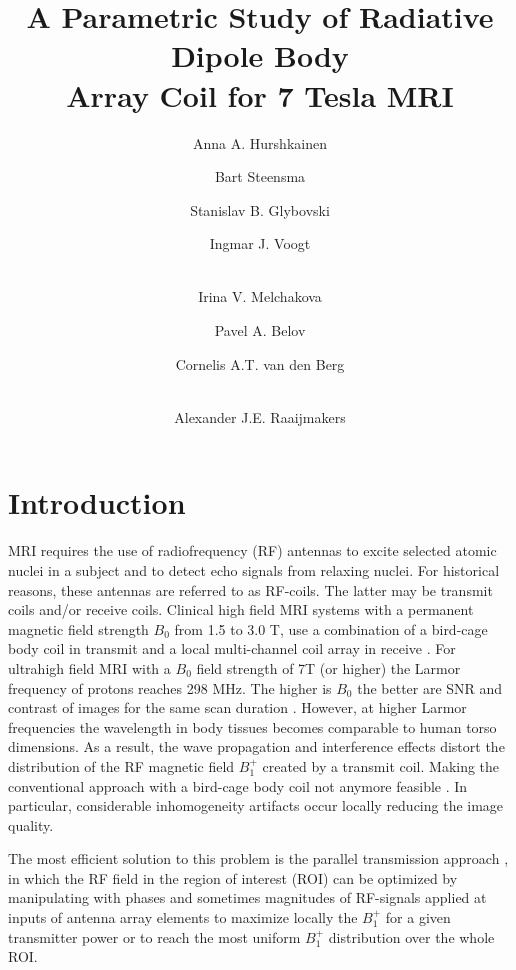 \documentclass[fleqn,10pt]{wlscirep}
\title{A Parametric Study of Radiative Dipole Body\\ Array Coil for 7 Tesla MRI}
\author[1,*]{Anna A. Hurshkainen}
\author[2]{Bart Steensma}
\author[1]{Stanislav B. Glybovski}
\author[2]{Ingmar J. Voogt}
\author[1]{\\Irina V. Melchakova}
\author[1]{Pavel A. Belov}
\author[2]{Cornelis A.T. van den Berg}
\author[2]{\\Alexander J.E. Raaijmakers}
\affil[1]{Faculty of Physics and Engineering, ITMO University, 197101 St. Petersburg, Russia}
\affil[2]{University Medical Center Utrecht, 3584 CX, Netherlands}
\affil[*]{a.hurshkainen@metalab.ifmo.ru}
\begin{document}
\maketitle

\thispagestyle{empty}

\section*{Introduction}

MRI requires the use of radiofrequency (RF) antennas to excite selected atomic nuclei in a subject and to detect echo signals from relaxing nuclei. For historical reasons, these antennas are referred to as RF-coils. The latter may be transmit coils and/or receive coils. Clinical high field MRI systems with a permanent magnetic field strength $B_0$ from 1.5 to 3.0 T,  use a combination of a bird-cage body coil \cite{HAYES1985622} in transmit and a local multi-channel coil array in receive \cite{surfaceloop}. For ultrahigh field MRI with a $B_0$ field strength of 7T (or higher) the Larmor frequency of protons reaches 298 MHz. The higher is $B_0$ the better are SNR and contrast of images for the same scan duration \cite{uugurbil2003ultrahigh,zwanenburg2008mr,kollia2009first}. However, at higher Larmor frequencies the wavelength in body tissues becomes comparable to human torso dimensions. As a result, the wave propagation and interference effects distort the distribution of the RF magnetic field $B_1^{+}$ created by a transmit coil. Making the conventional approach with a bird-cage body coil not anymore feasible \cite{Vaughan2009}. In particular, considerable inhomogeneity artifacts occur locally reducing the image quality.

The most efficient solution to this problem is the parallel transmission approach \cite{JMRI:JMRI6,IBRAHIM2000835,MRM:MRM10353,MRM:MRM20011}, in which the RF field in the region of interest (ROI) can be optimized by manipulating with phases and sometimes magnitudes of RF-signals applied at inputs of antenna array elements to maximize locally the $B_1^{+}$ for a given transmitter power or to reach the most uniform $B_1^{+}$ distribution over the whole ROI.
\end{document}
